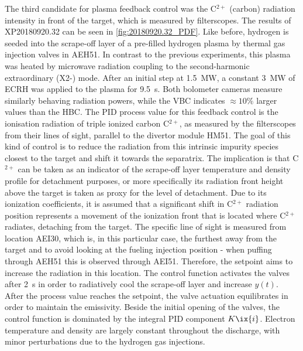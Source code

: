                 The third candidate for plasma feedback control was the C$^{2+}$ (carbon) radiation intensity in front of the target, which is measured by filterscopes. The results of XP20180920.32 can be seen in \cref{fig:20180920.32_PDF}. Like before, hydrogen is seeded into the scrape-off layer of a pre-filled hydrogen plasma by thermal gas injection valves in AEH51. In contrast to the previous experiments, this plasma was heated by microwave radiation coupling to the second-harmonic extraordinary (X2-) mode. After an initial step at \SI{1.5}{\mega\watt}, a constant \SI{3}{\mega\watt} of ECRH was applied to the plasma for \SI{9.5}{\second}. Both bolometer cameras measure similarly behaving radiation powers, while the VBC indicates $\approx10\%$ larger values than the HBC. The PID process value for this feedback control is the ionisation radiation of triple ionized carbon C$^{2+}$, as measured by the filterscopes from their lines of sight, parallel to the divertor module HM51. The goal of this kind of control is to reduce the radiation from this intrinsic impurity species closest to the target and shift it towards the separatrix. The implication is that C$^{2+}$ can be taken as an indicator of the scrape-off layer temperature and density profile for detachment purposes, or more specifically its radiation front height above the target is taken as proxy for the level of detachment. Due to its ionization coefficients, it is assumed that a significant shift in C$^{2+}$ radiation position represents a movement of the ionization front that is located where C$^{2+}$ radiates, detaching from the target. The specific line of sight is measured from location AEI30, which is, in this particular case, the furthest away from the target and to avoid looking at the fueling injection position - when puffing through AEH51 this is observed through AEI51. Therefore, the setpoint aims to increase the radiation in this location. The control function activates the valves after \SI{2}{\second} in order to radiatively cool the scrape-off layer and increase $y\left(t\right)$. After the process value reaches the setpoint, the valve actuation equilibrates in order to maintain the emissivity. Beside the initial opening of the valves, the control function is dominated by the integral PID component $K\ix{i}$. Electron temperature and density are largely constant throughout the discharge, with minor perturbations due to the hydrogen gas injections.\\%
%
